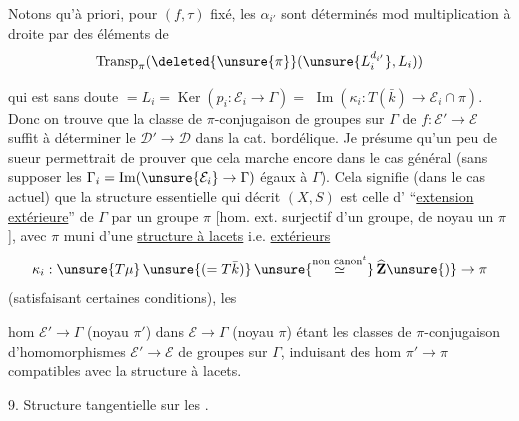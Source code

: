  Notons qu'à priori, pour $(f,\tau)$ fixé, les $\alpha_{i'}$ sont déterminés mod multiplication à droite par des éléments de
\[
 \operatorname{Transp}_{\pi}(\deleted{\unsure{\pi}}(\unsure{L_i^{d_{i'}}},L_i))
\]


qui est sans doute $=L_i=\operatorname{Ker}(p_i:\mathcal{E}_i\to\Gamma)=$ \uline{$\operatorname{Im}$}$(\kappa_i:T(\bar{k})\to\mathcal{E}_i\cap\pi)$.
Donc on trouve que  la classe de  $\pi$-conjugaison de groupes sur $\Gamma$ de $f:\mathcal{E}'\to\mathcal{E}$ suffit à déterminer le  $\mathcal{D}'\to\mathcal{D}$ dans la cat. bordélique.
Je présume qu'un peu de sueur permettrait de prouver que cela marche encore dans le cas général (sans supposer les $\Gamma_i=\operatorname{Im}(\unsure{\mathcal{E}_i}\to\Gamma)$ égaux à $\Gamma$).
Cela signifie (dans le cas actuel) que la structure essentielle qui décrit $(X,S)$ est celle d' ``\uline{extension extérieure}'' de $\Gamma$ par un groupe $\pi$ [hom. ext. surjectif d'un groupe, de noyau un $\pi$], avec $\pi$ muni d'une \uline{structure à lacets} i.e.   \uline{extérieurs}
\[
\kappa_i:\unsure{T\mu}\,\unsure{(=T\bar{k})}\,\unsure{\overset{\text{non canon}^{t}}{\simeq}}\,\widehat{\mathbf{Z}}\unsure{)}\to\pi
\]
(satisfaisant certaines conditions), les


hom  $\mathcal{E}'\to\Gamma$ (noyau $\pi'$) dans $\mathcal{E}\to\Gamma$ (noyau $\pi$) étant les classes de $\pi$-conjugaison d'homomorphismes $\mathcal{E}'\to\mathcal{E}$ de groupes sur $\Gamma$, induisant des hom $\pi'\to\pi$ compatibles avec la structure à lacets.

9. Structure tangentielle  sur les .

